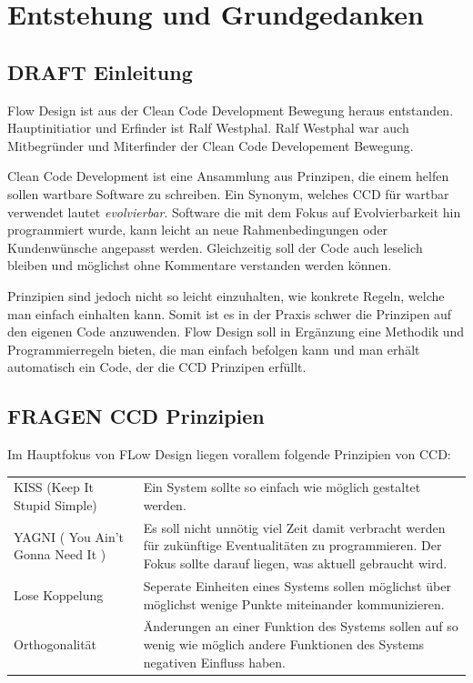 \documentclass[11pt]{article}
\date{\today}
\title{}
\begin{document}
\tableofcontents

\section{Entstehung und Grundgedanken}
\label{sec:orgheadline16}

\subsection{{\bfseries\sffamily DRAFT} Einleitung}
\label{sec:orgheadline1}

Flow Design ist aus der Clean Code Development Bewegung heraus entstanden. Hauptinitiatior und Erfinder ist Ralf Westphal.
Ralf Westphal war auch Mitbegründer und Miterfinder der Clean Code Developement Bewegung.


Clean Code Development ist eine Ansammlung aus Prinzipen, die einem helfen
sollen wartbare Software zu schreiben. Ein Synonym, welches CCD für wartbar
verwendet lautet \emph{evolvierbar}. 
Software die mit dem Fokus auf Evolvierbarkeit hin programmiert wurde,
kann leicht an neue Rahmenbedingungen oder Kundenwünsche angepasst werden.
Gleichzeitig soll der Code auch leselich bleiben und möglichst ohne Kommentare
verstanden werden können.

Prinzipien sind jedoch nicht so leicht einzuhalten, wie konkrete Regeln, welche man einfach einhalten kann.
Somit ist es in der Praxis schwer die Prinzipen auf den eigenen Code anzuwenden.
Flow Design soll in Ergänzung eine Methodik und Programmierregeln bieten, die man einfach befolgen kann und man erhält automatisch
ein Code, der die CCD Prinzipen erfüllt.

\subsection{{\bfseries\sffamily FRAGEN} CCD Prinzipien}
\label{sec:orgheadline6}
Im Hauptfokus von FLow Design liegen vorallem folgende Prinzipien von CCD:

\begin{center}
\begin{tabular}{ll}
KISS (Keep It Stupid Simple) & Ein System sollte so einfach wie möglich gestaltet werden.\\
YAGNI ( You Ain't Gonna Need It ) & Es soll nicht unnötig viel Zeit damit verbracht werden für zukünftige Eventualitäten zu programmieren. Der Fokus sollte darauf liegen, was aktuell gebraucht wird.\\
Lose Koppelung & Seperate Einheiten eines Systems sollen möglichst über möglichst wenige Punkte miteinander kommunizieren.\\
Orthogonalität & Änderungen an einer Funktion des Systems sollen auf so wenig wie möglich andere Funktionen des Systems negativen Einfluss haben.\\
\end{tabular}
\end{center}
\end{document}
